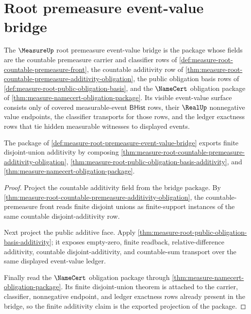 \section{Root premeasure event-value bridge}
\label{sec:measure-root-premeasure-event-value-bridge}

\begin{definition}
\label{def:measure-root-premeasure-event-value-bridge}
The $\MeasureUp$ root premeasure event-value bridge is the package whose
fields are the countable premeasure carrier and classifier rows of
\autoref{def:measure-root-countable-premeasure-front}, the countable
additivity row of
\autoref{thm:measure-root-countable-premeasure-additivity-obligation}, the
public obligation basis rows of
\autoref{def:measure-root-public-obligation-basis}, and the $\NameCert$
obligation package of \autoref{thm:measure-namecert-obligation-package}.
Its visible event-value surface consists only of covered measurable-event
$\mathsf{BHist}$ rows, their $\RealUp$ nonnegative value endpoints, the
classifier transports for those rows, and the ledger exactness rows that tie
hidden measurable witnesses to displayed events.
\end{definition}

\begin{theorem}
\label{thm:measure-root-premeasure-finite-additivity-bridge}
The package of \autoref{def:measure-root-premeasure-event-value-bridge}
exports finite disjoint-union additivity by composing
\autoref{thm:measure-root-countable-premeasure-additivity-obligation},
\autoref{thm:measure-root-public-obligation-basis-additivity}, and
\autoref{thm:measure-namecert-obligation-package}.
\end{theorem}
\begin{proof}
Project the countable additivity field from the bridge package. By
\autoref{thm:measure-root-countable-premeasure-additivity-obligation}, the
countable-premeasure front reads finite disjoint unions as finite-support
instances of the same countable disjoint-additivity row.

Next project the public additive face. Apply
\autoref{thm:measure-root-public-obligation-basis-additivity}; it exposes
empty-zero, finite readback, relative-difference additivity, countable
disjoint-additivity, and countable-sum transport over the same displayed
event-value ledger.

Finally read the $\NameCert$ obligation package through
\autoref{thm:measure-namecert-obligation-package}. Its finite disjoint-union
theorem is attached to the carrier, classifier, nonnegative endpoint, and
ledger exactness rows already present in the bridge, so the finite additivity
claim is the exported projection of the package.
\end{proof}

